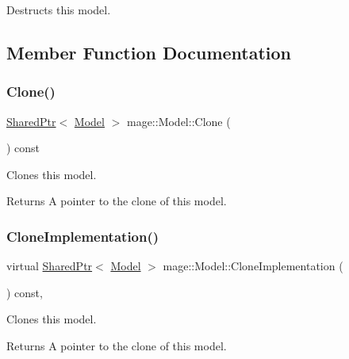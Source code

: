 Destructs this model. 

\subsection{Member Function Documentation}
\hypertarget{classmage_1_1_model_ac0043eb1766f8a5be05284fbb9c3e912}{}\label{classmage_1_1_model_ac0043eb1766f8a5be05284fbb9c3e912} 
\subsubsection{\texorpdfstring{Clone()}{Clone()}}
{\footnotesize\ttfamily \hyperlink{namespacemage_a1e01ae66713838a7a67d30e44c67703e}{Shared\+Ptr}$<$ \hyperlink{classmage_1_1_model}{Model} $>$ mage\+::\+Model\+::\+Clone (\begin{DoxyParamCaption}{ }\end{DoxyParamCaption}) const}

Clones this model.

\begin{DoxyReturn}{Returns}
A pointer to the clone of this model. 
\end{DoxyReturn}
\hypertarget{classmage_1_1_model_af90feb622e30e1531983c01372b2df37}{}\label{classmage_1_1_model_af90feb622e30e1531983c01372b2df37} 
\subsubsection{\texorpdfstring{Clone\+Implementation()}{CloneImplementation()}}
{\footnotesize\ttfamily virtual \hyperlink{namespacemage_a1e01ae66713838a7a67d30e44c67703e}{Shared\+Ptr}$<$ \hyperlink{classmage_1_1_model}{Model} $>$ mage\+::\+Model\+::\+Clone\+Implementation (\begin{DoxyParamCaption}{ }\end{DoxyParamCaption}) const\hspace{0.3cm}{\ttfamily [private]}, {\ttfamily [virtual]}}

Clones this model.

\begin{DoxyReturn}{Returns}
A pointer to the clone of this model. 
\end{DoxyReturn}
\hypertarget{classmage_1_1_model_a13badcd5e7bfaf8fbdc447dc211d5ad9}{}\label{classmage_1_1_model_a13badcd5e7bfaf8fbdc447dc211d5ad9} 
